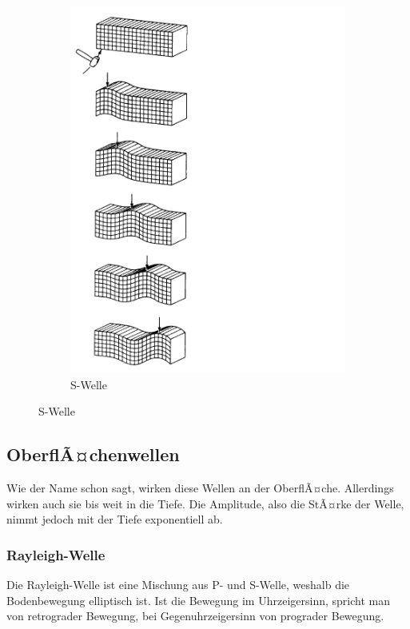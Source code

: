 \begin{figure}[H]
\begin{subfigure}[m]{0.5\textwidth}
		\includegraphics[scale = 0.3]{SeismikBilder/SWelle}
		\caption*{S-Welle}
	\end{subfigure}
\end{figure}

\subsection{OberflÃ¤chenwellen}
Wie der Name schon sagt, wirken diese Wellen an der OberflÃ¤che. Allerdings wirken auch sie bis weit in die Tiefe. Die Amplitude, also die StÃ¤rke der Welle, nimmt jedoch mit der Tiefe exponentiell ab. 

\subsubsection{Rayleigh-Welle}
Die Rayleigh-Welle ist eine Mischung aus P- und S-Welle, weshalb die Bodenbewegung elliptisch ist. Ist die Bewegung im Uhrzeigersinn, spricht man von retrograder Bewegung, bei Gegenuhrzeigersinn von prograder Bewegung.

